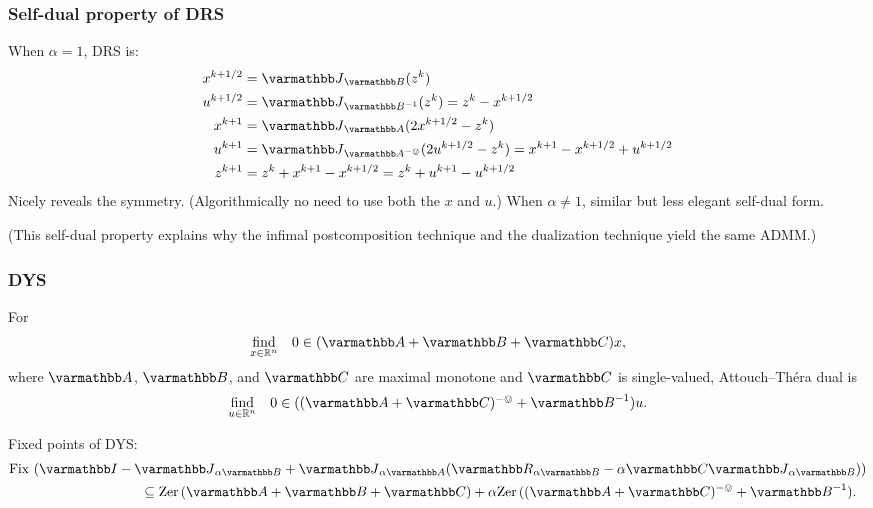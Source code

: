 \documentclass[10pt,mathserif]{beamer}
\begin{document}
\begin{frame}
\frametitle{Self-dual property of DRS}
When $\alpha=1$, DRS is:
\begin{align*}
x^{k+1/2}&=\opJ_{\opB }(z^k)\\
 u ^{k+1/2}&=\opJ_{\opB ^{-1}}(z^k)=z^k-x^{k+1/2}\\
x^{k+1}&=\opJ_{ \opA }(2x^{k+1/2}-z^k)\\
 u ^{k+1}&=\opJ_{\opA ^{-\ovee}}(2 u ^{k+1/2}-z^k)=x^{k+1}-x^{k+1/2}+ u ^{k+1/2}\\
z^{k+1}&=z^k+x^{k+1}-x^{k+1/2}=z^k+ u ^{k+1}- u ^{k+1/2}
\end{align*}
Nicely reveals the symmetry.
(Algorithmically no need to use both the $x$ and $ u $.)
When $\alpha\ne 1$, similar but less elegant self-dual form.

\vspace{0.2in}



(This self-dual property explains why the infimal postcomposition technique and the dualization technique yield the same ADMM.)
\end{frame}

\begin{frame}
\frametitle{DYS}
For 
\[ 
\begin{array}{ll}
\underset{x\in\reals^n}{\mathrm{find}} &
0\in (\opA+\opB+\opC)x,
\end{array}
\]
where $\opA$, $\opB$, and $\opC$ are maximal monotone and $\opC$ is single-valued,
 Attouch--Th\'era dual is
\[ 
\begin{array}{ll}
\underset{ u \in\reals^n}{\mathrm{find}} &
0\in ((\opA+\opC)^{-\ovee}+\opB^{-1}) u .
\end{array}
\]
\vspace{0.2in}

Fixed points of DYS:
\begin{align*}
\fix&\left(\opI-\opJ_{\alpha \opB}+\opJ_{\alpha \opA}(\opR_{\alpha \opB}-\alpha \opC\opJ_{\alpha \opB})\right)\\
&\qquad\qquad\qquad\qquad\subseteq\zer(\opA+\opB+\opC)+\alpha \zer((\opA+\opC)^{-\ovee}+\opB^{-1}).
\end{align*}
\end{frame}
\end{document}
